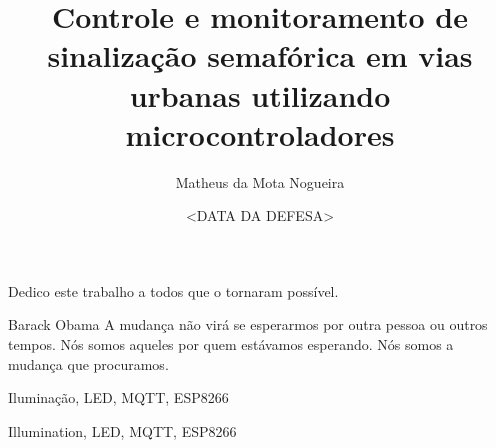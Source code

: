 \documentclass[bsc]{ufpethesis}
\institute{Centro de Tecnologia e Geociências}
\title{Controle e monitoramento de sinalização semafórica em vias urbanas utilizando microcontroladores}
\date{<DATA DA DEFESA>}
\author{Matheus da Mota Nogueira}
\begin{document}
\frontmatter

\frontpage

\presentationpage

\begin{dedicatory}
    Dedico este trabalho a todos que o tornaram possível.
\end{dedicatory}

\acknowledgements
    

\begin{epigraph}{Barack Obama}
A mudança não virá se esperarmos por outra pessoa ou outros tempos. Nós somos aqueles por quem estávamos esperando. Nós somos a mudança que procuramos.
\end{epigraph}

\resumo

\begin{keywords}
    Iluminação, LED, MQTT, ESP8266
\end{keywords}

\abstract

\begin{keywords}
    Illumination, LED, MQTT, ESP8266
\end{keywords}

\tableofcontents

\listoffigures

\listoftables



\mainmatter



%



\end{document}
